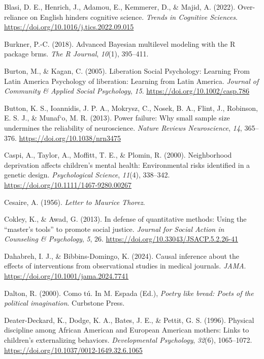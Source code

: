 \documentclass[
  letterpaper,
  DIV=11,
  numbers=noendperiod]{scrreprt}
\newlength{\cslhangindent}
\newenvironment{CSLReferences}[2] %
 {\begin{list}{}{%
  \setlength{\itemindent}{0pt}
  \setlength{\leftmargin}{0pt}
  \setlength{\parsep}{0pt}
  \ifodd #1
   \setlength{\leftmargin}{\cslhangindent}
   \setlength{\itemindent}{-1\cslhangindent}
  \fi
  \setlength{\itemsep}{#2\baselineskip}}}
 {\end{list}}
\begin{document}
\begin{CSLReferences}{1}{0}
Blasi, D. E., Henrich, J., Adamou, E., Kemmerer, D., \& Majid, A.
(2022). Over-reliance on {E}nglish hinders cognitive science.
\emph{Trends in Cognitive Sciences}.
\url{https://doi.org/10.1016/j.tics.2022.09.015}

Burkner, P.-C. (2018). Advanced {B}ayesian multilevel modeling with the
{R} package brms. \emph{The R Journal}, \emph{10}(1), 395--411.

Burton, M., \& Kagan, C. (2005). {Liberation Social Psychology: Learning
From Latin America Psychology of liberation: Learning from Latin
America}. \emph{Journal of Community \& Applied Social Psychology},
\emph{15}. \url{https://doi.org/10.1002/casp.786}

Button, K. S., Ioannidis, J. P. A., Mokrysz, C., Nosek, B. A., Flint,
J., Robinson, E. S. J., \& Munaf`o, M. R. (2013). Power failure: Why
small sample size undermines the reliability of neuroscience.
\emph{Nature Reviews Neuroscience}, \emph{14}, 365--376.
\url{https://doi.org/10.1038/nrn3475}

Caspi, A., Taylor, A., Moffitt, T. E., \& Plomin, R. (2000).
Neighborhood deprivation affects children's mental health: Environmental
risks identified in a genetic design. \emph{Psychological Science},
\emph{11}(4), 338--342. \url{https://doi.org/10.1111/1467-9280.00267}

Cesaire, A. (1956). \emph{Letter to {M}aurice {T}horez}.

Cokley, K., \& Awad, G. (2013). In defense of quantitative methods:
Using the {``master's tools''} to promote social justice. \emph{Journal
for Social Action in Counseling \& Psychology}, \emph{5}, 26.
\url{https://doi.org/10.33043/JSACP.5.2.26-41}

Dahabreh, I. J., \& Bibbins-Domingo, K. (2024). Causal inference about
the effects of interventions from observational studies in medical
journals. \emph{JAMA}. \url{https://doi.org/10.1001/jama.2024.7741}

Dalton, R. (2000). Como t{ú}. In M. Espada (Ed.), \emph{Poetry like
bread: Poets of the political imagination}. Curbstone Press.

Deater-Deckard, K., Dodge, K. A., Bates, J. E., \& Pettit, G. S. (1996).
{Physical discipline among African American and European American
mothers: Links to children's externalizing behaviors.}
\emph{Developmental Psychology}, \emph{32}(6), 1065--1072.
\url{https://doi.org/10.1037/0012-1649.32.6.1065}


\end{CSLReferences}
\end{document}
